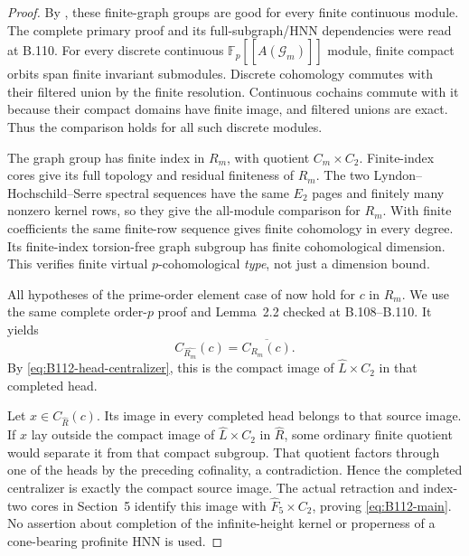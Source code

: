 \begin{proof}
By \citet[Theorem~3.15]{B_Lorensen2008}, these finite-graph groups
are good for every finite continuous module. The complete primary
proof and its full-subgraph/HNN dependencies were read at B.110.
For every discrete continuous $\mathbb F_p[[\widehat{A(\mathcal G_m)}]]$
module, finite compact orbits span finite invariant submodules.
Discrete cohomology commutes with their filtered union by the finite
resolution. Continuous cochains commute with it because their compact
domains have finite image, and filtered unions are exact. Thus the
comparison holds for all such discrete modules.

The graph group has finite index in $R_m$, with quotient
$C_m\times C_2$. Finite-index cores give its full topology and
residual finiteness of $R_m$. The two Lyndon--Hochschild--Serre
spectral sequences have the same $E_2$ pages and finitely many
nonzero kernel rows, so they give the all-module comparison for
$R_m$. With finite coefficients the same finite-row sequence gives
finite cohomology in every degree. Its finite-index torsion-free
graph subgroup has finite cohomological dimension. This verifies
finite virtual $p$-cohomological \emph{type}, not just a dimension
bound.

All hypotheses of the prime-order element case of
\citet[Theorem~4.3]{BoggiZalesskii2025} now hold for $c$ in $R_m$.
We use the same complete order-$p$ proof and Lemma~2.2 checked at
B.108--B.110. It yields
\[
 C_{\widehat{R_m}}(c)=\overline{C_{R_m}(c)}.
\]
By \eqref{eq:B112-head-centralizer}, this is the compact image of
$\widehat L\times C_2$ in that completed head.

Let $x\in C_{\widehat R}(c)$. Its image in every completed head
belongs to that source image. If $x$ lay outside the compact image
of $\widehat L\times C_2$ in $\widehat R$, some ordinary finite
quotient would separate it from that compact subgroup. That quotient
factors through one of the heads by the preceding cofinality, a
contradiction. Hence the completed centralizer is exactly the compact
source image. The actual retraction and index-two cores in Section~5
identify this image with $\widehat F_5\times C_2$, proving
\eqref{eq:B112-main}. No assertion about completion of the
infinite-height kernel or properness of a cone-bearing profinite
HNN is used.


\end{proof}
